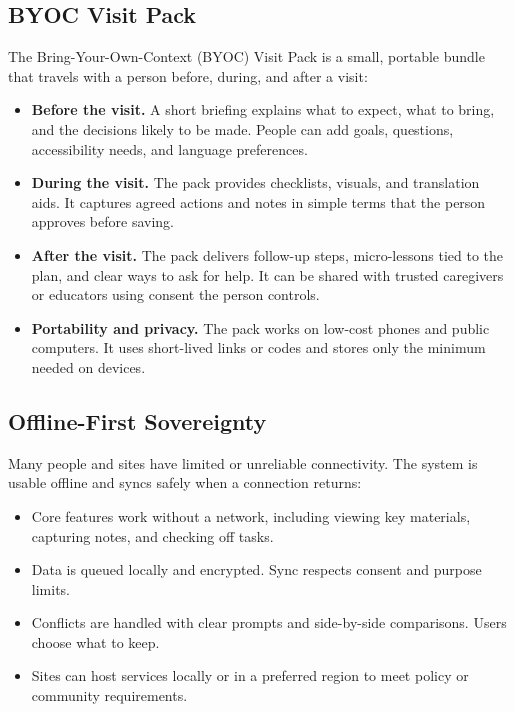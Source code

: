 \documentclass[12pt]{article}
\begin{document}
\subsection*{BYOC Visit Pack}
The Bring-Your-Own-Context (BYOC) Visit Pack is a small, portable bundle that travels with a person before, during, and after a visit:
\begin{itemize}[leftmargin=*]
  \item \textbf{Before the visit.} A short briefing explains what to expect, what to bring, and the decisions likely to be made. People can add goals, questions, accessibility needs, and language preferences.
  \item \textbf{During the visit.} The pack provides checklists, visuals, and translation aids. It captures agreed actions and notes in simple terms that the person approves before saving.
  \item \textbf{After the visit.} The pack delivers follow-up steps, micro-lessons tied to the plan, and clear ways to ask for help. It can be shared with trusted caregivers or educators using consent the person controls.
  \item \textbf{Portability and privacy.} The pack works on low-cost phones and public computers. It uses short-lived links or codes and stores only the minimum needed on devices.
\end{itemize}

\subsection*{Offline-First Sovereignty}
Many people and sites have limited or unreliable connectivity. The system is usable offline and syncs safely when a connection returns:
\begin{itemize}[leftmargin=*]
  \item Core features work without a network, including viewing key materials, capturing notes, and checking off tasks.
  \item Data is queued locally and encrypted. Sync respects consent and purpose limits.
  \item Conflicts are handled with clear prompts and side-by-side comparisons. Users choose what to keep.
  \item Sites can host services locally or in a preferred region to meet policy or community requirements.
\end{itemize}
\end{document}
